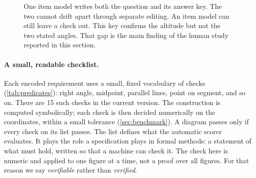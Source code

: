 \begin{figure}[t]
\centering
{}
\caption{One item model writes both the question and its answer key. The two cannot drift apart through separate editing. An item model can still leave a check out. This key confirms the altitude but not the two stated angles. That gap is the main finding of the human study reported in this section.}
\label{fig:cogen}
\end{figure}

\paragraph{A small, readable checklist.}
Each encoded requirement uses a small, fixed vocabulary of checks (\cref{tab:predicates}): right angle, midpoint, parallel lines, point on segment, and so on. There are 15 such checks in the current version. The construction is computed symbolically; each check is then decided numerically on the coordinates, within a small tolerance (\cref{sec:benchmark}). A diagram passes only if every check on its list passes. The list defines what the automatic scorer evaluates. It plays the role a specification plays in formal methods: a statement of what must hold, written so that a machine can check it. The check here is numeric and applied to one figure at a time, not a proof over all figures. For that reason we say \emph{verifiable} rather than \emph{verified}.


